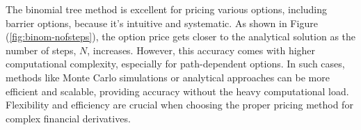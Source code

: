 The binomial tree method is excellent for pricing various options, including barrier options, because it's intuitive and systematic. As shown in Figure (\ref{fig:binom-nofsteps}), the option price gets closer to the analytical solution as the number of steps, $N$, increases. However, this accuracy comes with higher computational complexity, especially for path-dependent options. In such cases, methods like Monte Carlo simulations or analytical approaches can be more efficient and scalable, providing accuracy without the heavy computational load. Flexibility and efficiency are crucial when choosing the proper pricing method for complex financial derivatives.